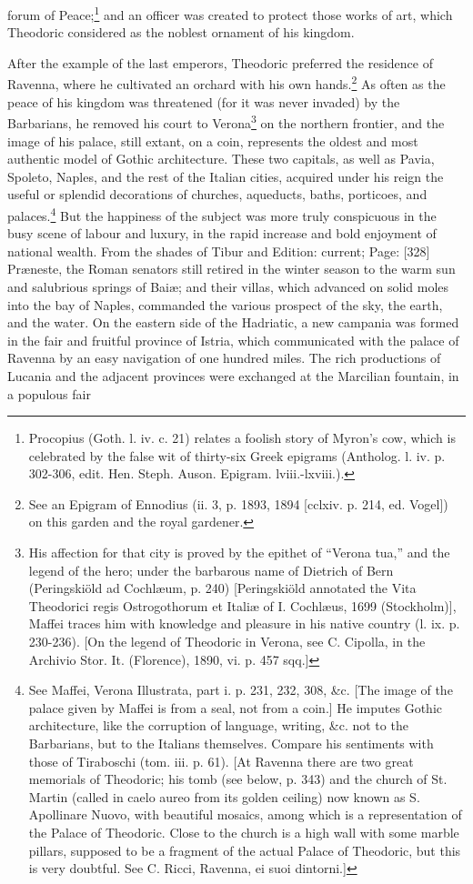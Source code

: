 forum of Peace;\footnote{Procopius (Goth. l. iv. c. 21) relates a foolish story of Myron\texthebrew{}’s cow, which is celebrated by the false wit of thirty-six Greek epigrams (Antholog. l. iv. p. 302-306, edit. Hen. Steph. Auson. Epigram. lviii.-lxviii.).} and an officer was created to protect those works of art, which Theodoric considered as the noblest ornament of his kingdom.

After the example of the last emperors, Theodoric preferred the residence of Ravenna, where he cultivated an orchard with his own hands.\footnote{See an Epigram of Ennodius (ii. 3, p. 1893, 1894 [cclxiv. p. 214, ed. Vogel]) on this garden and the royal gardener.} As often as the peace of his kingdom was threatened (for it was never invaded) by the Barbarians, he removed his court to Verona\footnote{His affection for that city is proved by the epithet of \texthebrew{“}Verona tua,\texthebrew{}” and the legend of the hero; under the barbarous name of Dietrich of Bern (Peringskiöld ad Cochlæum, p. 240) [Peringskiöld annotated the Vita Theodorici regis Ostrogothorum et Italiæ of I. Cochlæus, 1699 (Stockholm)], Maffei traces him with knowledge and pleasure in his native country (l. ix. p. 230-236). [On the legend of Theodoric in Verona, see C. Cipolla, in the Archivio Stor. It. (Florence), 1890, vi. p. 457 sqq.]} on the northern frontier, and the image of his palace, still extant, on a coin, represents the oldest and most authentic model of Gothic architecture. These two capitals, as well as Pavia, Spoleto, Naples, and the rest of the Italian cities, acquired under his reign the useful or splendid decorations of churches, aqueducts, baths, porticoes, and palaces.\footnote{See Maffei, Verona Illustrata, part i. p. 231, 232, 308, \&c. [The image of the palace given by Maffei is from a seal, not from a coin.] He imputes Gothic architecture, like the corruption of language, writing, \&c. not to the Barbarians, but to the Italians themselves. Compare his sentiments with those of Tiraboschi (tom. iii. p. 61). [At Ravenna there are two great memorials of Theodoric; his tomb (see below, p. 343) and the church of St. Martin (called in caelo aureo from its golden ceiling) now known as S. Apollinare Nuovo, with beautiful mosaics, among which is a representation of the Palace of Theodoric. Close to the church is a high wall with some marble pillars, supposed to be a fragment of the actual Palace of Theodoric, but this is very doubtful. See C. Ricci, Ravenna, ei suoi dintorni.]} But the happiness of the subject was more truly conspicuous in the busy scene of labour and luxury, in the rapid increase and bold enjoyment of national wealth. From the shades of Tibur and Edition: current; Page: [328] Præneste, the Roman senators still retired in the winter season to the warm sun and salubrious springs of Baiæ; and their villas, which advanced on solid moles into the bay of Naples, commanded the various prospect of the sky, the earth, and the water. On the eastern side of the Hadriatic, a new campania was formed in the fair and fruitful province of Istria, which communicated with the palace of Ravenna by an easy navigation of one hundred miles. The rich productions of Lucania and the adjacent provinces were exchanged at the Marcilian fountain, in a populous fair 